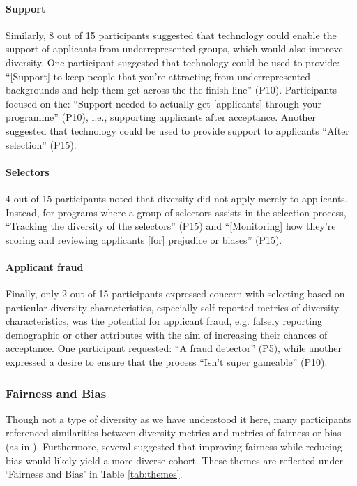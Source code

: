 \paragraph{Support}
Similarly, 8 out of 15 participants suggested that technology could enable the support of applicants from underrepresented groups, which would also improve diversity. One participant suggested that technology could be used to provide: ``[Support] to keep people that you're attracting from underrepresented backgrounds and help them get across the the finish line'' (P10). Participants focused on the: ``Support needed to actually get [applicants] through your programme'' (P10), i.e., supporting applicants after acceptance. Another suggested that technology could be used to provide support to applicants ``After selection'' (P15).

\paragraph{Selectors}
4 out of 15 participants noted that diversity did not apply merely to applicants. Instead, for programs where a group of selectors assists in the selection process, ``Tracking the diversity of the selectors'' (P15) and ``[Monitoring] how they're scoring and reviewing applicants [for] prejudice or biases'' (P15).

\paragraph{Applicant fraud}
Finally, only 2 out of 15 participants expressed concern with selecting based on particular diversity characteristics, especially self-reported metrics of diversity characteristics, was the potential for applicant fraud, e.g. falsely reporting demographic or other attributes with the aim of increasing their chances of acceptance. One participant requested: ``A fraud detector'' (P5), while another expressed a desire to ensure that the process ``Isn't super gameable'' (P10).

\subsubsection{Fairness and Bias}
Though not a type of diversity as we have understood it here, many participants referenced similarities between diversity metrics and metrics of fairness or bias (as in \textcite{zhao2023fairness}). Furthermore, several suggested that improving fairness while reducing bias would likely yield a more diverse cohort. These themes are reflected under `Fairness and Bias' in Table \ref{tab:themes}.

